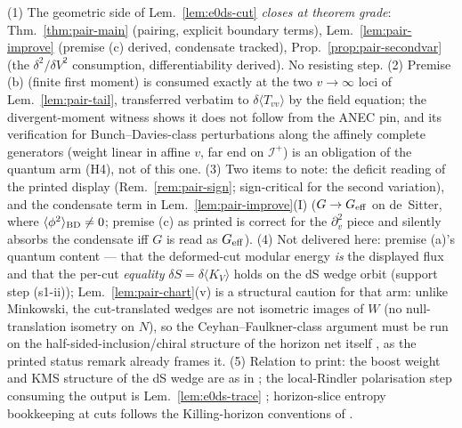 \begin{remark}
\label{rem:pair-status}
(1) The geometric side of Lem.~\ref{lem:e0ds-cut} \emph{closes at
theorem grade}: Thm.~\ref{thm:pair-main} (pairing, explicit boundary
terms), Lem.~\ref{lem:pair-improve} (premise (c) derived, condensate
tracked), Prop.~\ref{prop:pair-secondvar} (the
$\delta^{2}/\delta V^{2}$ consumption, differentiability derived).
No resisting step. (2) Premise (b) (finite first moment) is consumed
exactly at the two $v\to\infty$ loci of Lem.~\ref{lem:pair-tail},
transferred verbatim to $\delta\langle T_{vv}\rangle$ by the field
equation; the divergent-moment witness shows it does not follow from the
ANEC pin, and its verification for Bunch--Davies-class perturbations
along the affinely complete generators (weight linear in affine $v$,
far end on $\mathscr{I}^{+}$) is an obligation of the quantum arm
(H4), not of this one. (3) Two items to note:
the deficit reading of the printed display (Rem.~\ref{rem:pair-sign};
sign-critical for the second variation), and the condensate term in
Lem.~\ref{lem:pair-improve}(I) ($G\to G_{\rm eff}$ on de~Sitter,
where $\langle\phi^{2}\rangle_{\rm BD}\neq0$; premise (c) as printed
is correct for the $\partial_{v}^{2}$ piece and silently absorbs the
condensate iff $G$ is read as $G_{\rm eff}$). (4) Not delivered here:
premise (a)'s quantum content --- that the deformed-cut modular
energy \emph{is} the displayed flux and that the per-cut
\emph{equality} $\delta S=\delta\langle K_{V}\rangle$ holds on the dS
wedge orbit (support step (s1-ii)); Lem.~\ref{lem:pair-chart}(v) is a
structural caution for that arm: unlike Minkowski, the cut-translated
wedges are not isometric images of $W$ (no null-translation isometry
on $N$), so the Ceyhan--Faulkner-class argument must be run on the
half-sided-inclusion/chiral structure of the horizon net itself
\cite{CeyhanFaulkner2018,FaulknerSperanza2024}, as the printed status
remark already frames it. (5) Relation to print: the boost weight and
KMS structure of the dS wedge are as in \cite{BorchersBuchholz1999};
the local-Rindler polarisation step consuming the output is
Lem.~\ref{lem:e0ds-trace} \cite{Jacobson1995}; horizon-slice entropy
bookkeeping at cuts follows the Killing-horizon conventions of
\cite{Wall2012}.
\end{remark}
